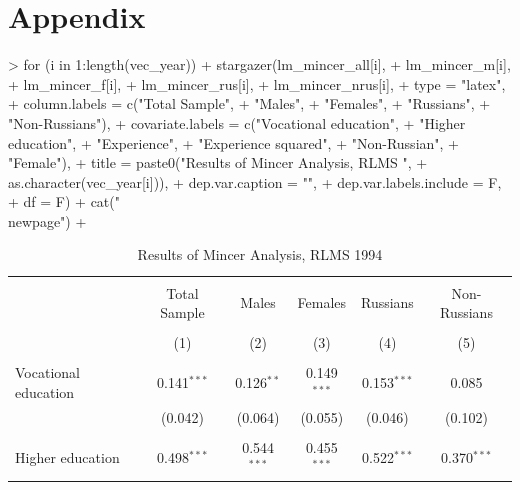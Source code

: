\documentclass[12pt,a4paper]{article}
\begin{document}
\printbibliography  

\newpage
\section*{Appendix}

\begin{Schunk}
\begin{Sinput}
> for (i in 1:length(vec_year)){
+   stargazer(lm_mincer_all[i],
+             lm_mincer_m[i],
+             lm_mincer_f[i],
+             lm_mincer_rus[i],
+             lm_mincer_nrus[i],
+             type = "latex",
+             column.labels = c("Total Sample",
+                               "Males", 
+                               "Females", 
+                               "Russians",
+                               "Non-Russians"),
+             covariate.labels = c("Vocational education",
+                                  "Higher education",
+                                  "Experience",
+                                  "Experience squared",
+                                  "Non-Russian",
+                                  "Female"),
+             title = paste0("Results of Mincer Analysis, RLMS ",
+                          as.character(vec_year[i])),
+             dep.var.caption = "",
+             dep.var.labels.include = F,
+             df = F)
+   cat("\n\\newpage\n")
+ }
\end{Sinput}
\begin{table}[!htbp] \centering 
  \caption{Results of Mincer Analysis, RLMS 1994} 
  \label{} 
\begin{tabular}{@{\extracolsep{5pt}}lccccc} 
\\[-1.8ex]\hline 
\hline \\[-1.8ex] 
 & Total Sample & Males & Females & Russians & Non-Russians \\ 
\\[-1.8ex] & (1) & (2) & (3) & (4) & (5)\\ 
\hline \\[-1.8ex] 
 Vocational education & 0.141$^{***}$ & 0.126$^{**}$ & 0.149$^{***}$ & 0.153$^{***}$ & 0.085 \\ 
  & (0.042) & (0.064) & (0.055) & (0.046) & (0.102) \\ 
  & & & & & \\ 
 Higher education & 0.498$^{***}$ & 0.544$^{***}$ & 0.455$^{***}$ & 0.522$^{***}$ & 0.370$^{***}$ \\ 

\end{tabular}
\end{table}
\end{Schunk}
\end{document}
